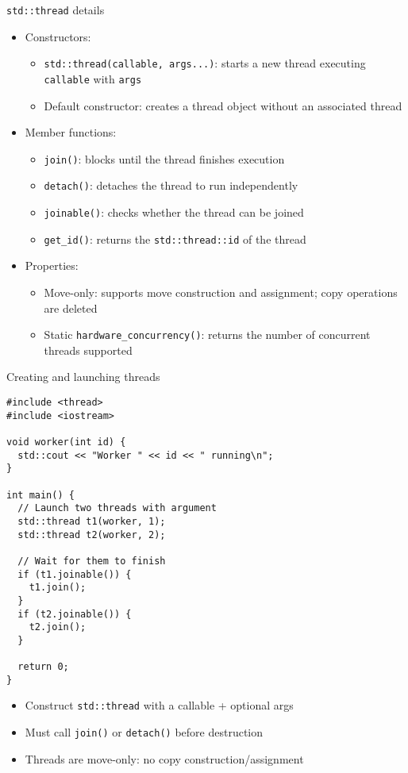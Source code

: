 \documentclass{beamer}
\begin{document}
\begin{frame}{\texttt{std::thread} details}
  \begin{itemize}
    \item Constructors:
      \begin{itemize}
        \item \texttt{std::thread(callable, args...)}: starts a new thread executing \texttt{callable} with \texttt{args}
        \item Default constructor: creates a thread object without an associated thread
      \end{itemize}
    \item Member functions:
      \begin{itemize}
        \item \texttt{join()}: blocks until the thread finishes execution
        \item \texttt{detach()}: detaches the thread to run independently
        \item \texttt{joinable()}: checks whether the thread can be joined
        \item \texttt{get\_id()}: returns the \texttt{std::thread::id} of the thread
      \end{itemize}
    \item Properties:
      \begin{itemize}
        \item Move-only: supports move construction and assignment; copy operations are deleted
        \item Static \texttt{hardware\_concurrency()}: returns the number of concurrent threads supported
      \end{itemize}
  \end{itemize}
\end{frame}

\begin{frame}[fragile]{Creating and launching threads}
  \lstset{style=CStyle}
  \begin{lstlisting}
#include <thread>
#include <iostream>

void worker(int id) {
  std::cout << "Worker " << id << " running\n";
}

int main() {
  // Launch two threads with argument
  std::thread t1(worker, 1);
  std::thread t2(worker, 2);

  // Wait for them to finish
  if (t1.joinable()) {
    t1.join();
  }
  if (t2.joinable()) {
    t2.join();
  }

  return 0;
}
  \end{lstlisting}
  \begin{itemize}
    \item Construct \texttt{std::thread} with a callable + optional args
    \item Must call \texttt{join()} or \texttt{detach()} before destruction
    \item Threads are move-only: no copy construction/assignment
  \end{itemize}
\end{frame}
\end{document}
